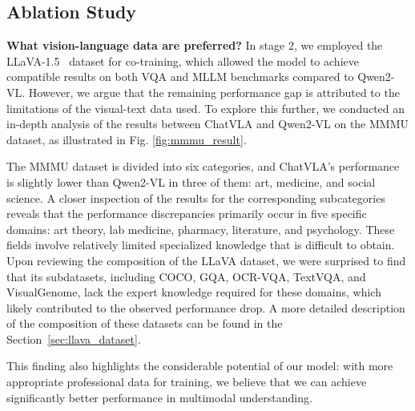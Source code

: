 \subsection{Ablation Study}


\textbf{What vision-language data are preferred?}
In stage 2, we employed the LLaVA-1.5~\cite{llava1.5} dataset for co-training, which allowed the model to achieve compatible results on both VQA and MLLM benchmarks compared to Qwen2-VL. However, we argue that the remaining performance gap is attributed to the limitations of the visual-text data used. To explore this further, we conducted an in-depth analysis of the results between ChatVLA and Qwen2-VL on the MMMU dataset, as illustrated in Fig. \ref{fig:mmmu_result}.

The MMMU dataset is divided into six categories, and ChatVLA's performance is slightly lower than Qwen2-VL in three of them: art, medicine, and social science. A closer inspection of the results for the corresponding subcategories reveals that the performance discrepancies primarily occur in five specific domains: art theory, lab medicine, pharmacy, literature, and psychology. These fields involve relatively limited specialized knowledge that is difficult to obtain. Upon reviewing the composition of the LLaVA dataset, we were surprised to find that its subdatasets, including COCO, GQA, OCR-VQA, TextVQA, and VisualGenome, lack the expert knowledge required for these domains, which likely contributed to the observed performance drop. A more detailed description of the composition of these datasets can be found in the Section~\ref{sec:llava_dataset}.

This finding also highlights the considerable potential of our model: with more appropriate professional data for training, we believe that we can achieve significantly better performance in multimodal understanding.

